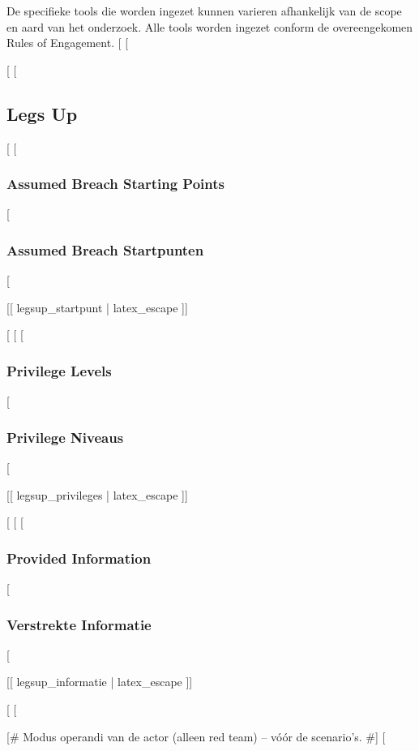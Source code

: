 {{{{De specifieke tools die worden ingezet kunnen varieren afhankelijk van de scope en aard van het onderzoek.
Alle tools worden ingezet conform de overeengekomen Rules of Engagement.
[%
[%

[%
[%
\subsection{Legs Up}

[%
[%
\subsubsection{Assumed Breach Starting Points}
[%
\subsubsection{Assumed Breach Startpunten}
[%

[[ legsup_startpunt | latex_escape ]]

[%
[%
[%
\subsubsection{Privilege Levels}
[%
\subsubsection{Privilege Niveaus}
[%

[[ legsup_privileges | latex_escape ]]

[%
[%
[%
\subsubsection{Provided Information}
[%
\subsubsection{Verstrekte Informatie}
[%

[[ legsup_informatie | latex_escape ]]

[%
[%

[# Modus operandi van de actor (alleen red team) -- vóór de scenario's. #]
[%
}}}}
